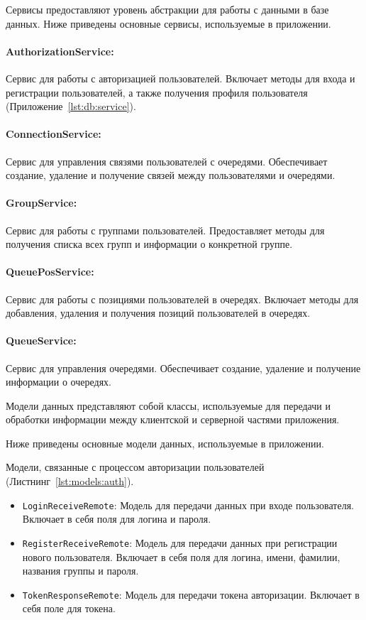 Сервисы предоставляют уровень абстракции для работы с данными в базе данных.
Ниже приведены основные сервисы, используемые в приложении.

\paragraph{AuthorizationService:} Сервис для работы
с авторизацией пользователей. Включает методы для входа
и регистрации пользователей, а также получения профиля пользователя
(Приложение~\ref{lst:db:service}).

\paragraph{ConnectionService:}
Сервис для управления связями пользователей с очередями.
Обеспечивает создание, удаление и получение связей между пользователями
и очередями.

\paragraph{GroupService:}
Сервис для работы с группами пользователей.
Предоставляет методы для получения списка всех групп
и информации о конкретной группе.

\paragraph{QueuePosService:}
Сервис для работы с позициями пользователей в очередях.
Включает методы для добавления, удаления
и получения позиций пользователей в очередях.

\paragraph{QueueService:}
Сервис для управления очередями. Обеспечивает создание, удаление
и получение информации о очередях.



Модели данных представляют собой классы, используемые для передачи
и обработки информации между клиентской и серверной частями приложения.\par
Ниже приведены основные модели данных, используемые в приложении.

Модели, связанные с процессом авторизации пользователей
(Листнинг~\ref{lst:models:auth}).

\begin{itemize}
    \item \texttt{LoginReceiveRemote}: Модель для передачи данных
		при входе пользователя. Включает в себя поля для логина и пароля.
    \item \texttt{RegisterReceiveRemote}: Модель для передачи данных
		при регистрации нового пользователя.
		Включает в себя поля для логина, имени, фамилии,
		названия группы и пароля.
    \item \texttt{TokenResponseRemote}: Модель для передачи
		токена авторизации. Включает в себя поле для токена.
\end{itemize}

